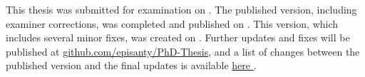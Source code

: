 \vspace{6mm}
\noindent
This thesis was submitted for examination on \submittedversiondate. 
The published version, including examiner corrections, was completed and published on \finalversiondate.
%
This version, which includes several minor fixes, was created on \compilationdate.
Further updates and fixes will be published at 
\href{https://github.com/episanty/PhD-Thesis}{github.com/episanty/PhD-Thesis}, 
and a list of changes between the published version and the final updates is available 
\href{https://github.com/episanty/PhD-Thesis/commits/master}{%
  here%
  }.








































